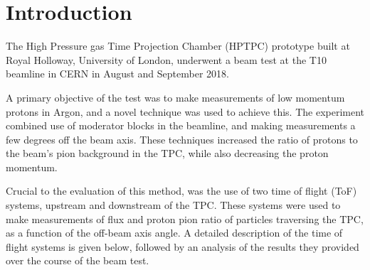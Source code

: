 \section{Introduction}

The High Pressure gas Time Projection Chamber (HPTPC) prototype built at Royal Holloway, University of London, underwent a beam test at the T10 beamline in CERN in August and September 2018.

A primary objective of the test was to make measurements of low momentum protons in Argon, and a novel technique was used to achieve this.
The experiment combined use of moderator blocks in the beamline, and making measurements a few degrees off the beam axis.
These techniques increased the ratio of protons to the beam's pion background in the TPC, while also decreasing the proton momentum.

Crucial to the evaluation of this method, was the use of two time of flight (ToF) systems, upstream and downstream of the TPC.
These systems were used to make measurements of flux and proton pion ratio of particles traversing the TPC, as a function of the off-beam axis angle.
A detailed description of the time of flight systems is given below, followed by an analysis of the results they provided over the course of the beam test.